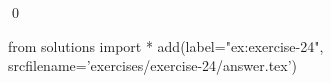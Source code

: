 
\begin{ex} 
  \label{ex:exercise-24}
  
  \qed
\end{ex} 
\begin{python0}
from solutions import *
add(label="ex:exercise-24",
    srcfilename='exercises/exercise-24/answer.tex') 
\end{python0}
